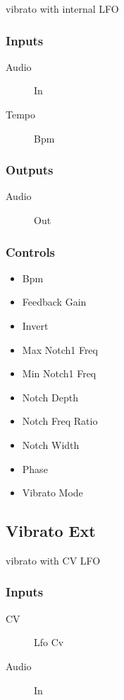 vibrato with internal LFO



\subsubsection{Inputs}
\begin{description}
\item [Audio] In
\item [Tempo] Bpm
\end{description}

\subsubsection{Outputs}
\begin{description}
\item [Audio] Out
\end{description}

\subsubsection{Controls}
\begin{itemize}
\item Bpm
\item Feedback Gain
\item Invert
\item Max Notch1 Freq
\item Min Notch1 Freq
\item Notch Depth
\item Notch Freq Ratio
\item Notch Width
\item Phase
\item Vibrato Mode
\end{itemize}

\subsection{Vibrato Ext}

vibrato with CV LFO



\subsubsection{Inputs}
\begin{description}
\item [CV] Lfo Cv
\item [Audio] In
\end{description}


